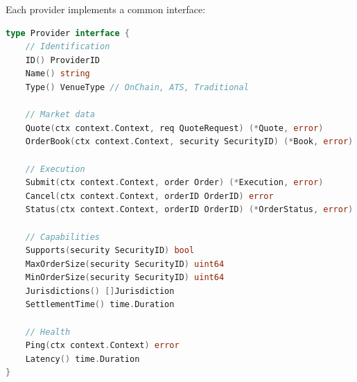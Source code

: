 Each provider implements a common interface:

\begin{lstlisting}[language=Go,caption={Provider interface.}]
type Provider interface {
    // Identification
    ID() ProviderID
    Name() string
    Type() VenueType // OnChain, ATS, Traditional

    // Market data
    Quote(ctx context.Context, req QuoteRequest) (*Quote, error)
    OrderBook(ctx context.Context, security SecurityID) (*Book, error)

    // Execution
    Submit(ctx context.Context, order Order) (*Execution, error)
    Cancel(ctx context.Context, orderID OrderID) error
    Status(ctx context.Context, orderID OrderID) (*OrderStatus, error)

    // Capabilities
    Supports(security SecurityID) bool
    MaxOrderSize(security SecurityID) uint64
    MinOrderSize(security SecurityID) uint64
    Jurisdictions() []Jurisdiction
    SettlementTime() time.Duration

    // Health
    Ping(ctx context.Context) error
    Latency() time.Duration
}
\end{lstlisting}

